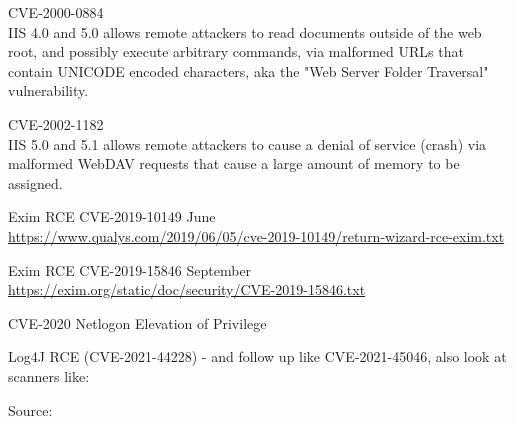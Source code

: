 \documentclass[Screen16to9,17pt]{foils}
\begin{document}
\begin{list2}
\item \small CVE-2000-0884\\
IIS 4.0 and 5.0 allows remote attackers to read documents outside of
the web root, and possibly execute arbitrary commands, via malformed
URLs that contain UNICODE encoded characters, aka the "Web Server
Folder Traversal" vulnerability.

\item \small CVE-2002-1182\\
IIS 5.0 and 5.1 allows remote attackers to cause a denial of service
(crash) via malformed WebDAV requests that cause a large amount of
memory to be assigned.

\item Exim RCE CVE-2019-10149 June\\ \url{https://www.qualys.com/2019/06/05/cve-2019-10149/return-wizard-rce-exim.txt}

\item Exim RCE CVE-2019-15846 September\\
\url{https://exim.org/static/doc/security/CVE-2019-15846.txt}

\item CVE-2020 Netlogon Elevation of Privilege \\
\item Log4J RCE (CVE-2021-44228) - and follow up like CVE-2021-45046, also look at scanners like:\\

\end{list2}
Source:\\
\end{document}
